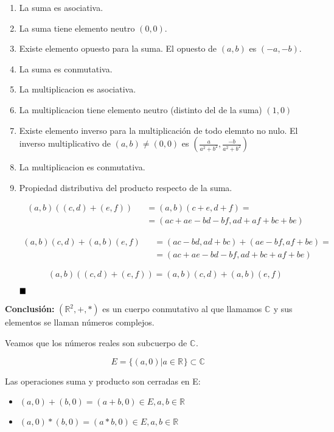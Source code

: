 \begin{enumerate}
  \item La suma es asociativa.
  \item La suma tiene elemento neutro \((0,0)\).
  \item Existe elemento opuesto para la suma. El opuesto de \((a,b)\) es \((-a,-b)\).
  \item La suma es conmutativa.
  \item La multiplicacion es asociativa.
  \item La multiplicacion tiene elemento neutro (distinto del de la suma) \((1,0)\)
  \item Existe elemento inverso para la multiplicación de todo elemnto no nulo. El inverso multiplicativo de \((a,b) \neq (0,0)\) es \((\frac{a}{a^2+b^2},\frac{-b}{a^2+b^2})\)
  \item La multiplicacion es conmutativa.
  \item Propiedad distributiva del producto respecto de la suma.

\begin{eqnarray*}
  (a,b)((c,d)+(e,f)) & & = (a,b)(c+e,d+f) = \\
                     & & = (ac+ae-bd-bf,ad+af+bc+be)
\end{eqnarray*}

\begin{eqnarray*}
  (a,b)(c,d)+(a,b)(e,f) & & = (ac-bd,ad+bc)+(ae-bf,af+be) = \\
                        & & = (ac+ae-bd-bf, ad+bc+af+be)
\end{eqnarray*}

\[(a,b)((c,d)+(e,f)) = (a,b)(c,d)+(a,b)(e,f)\]

\(\hfill \blacksquare\)

\end{enumerate}


\textbf{Conclusión:} \((\mathbb{R}^{2},+,*)\) es un cuerpo conmutativo al que llamamos \(\mathbb{C}^{}\) y sus elementos se llaman números complejos.

Veamos que los números reales son subcuerpo de \(\mathbb{C}^{}\).

\[ E= \{(a,0) | a \in \mathbb{R}^{}\} \subset \mathbb{C}^{}\]

Las operaciones suma y producto son cerradas en E:

\begin{itemize}
  \item \((a,0) + (b,0) = (a+b, 0) \in E, a,b \in \mathbb{R}^{}\)
  \item \((a,0)*(b,0) = (a*b, 0) \in E, a,b \in \mathbb{R}^{}\)
\end{itemize}

